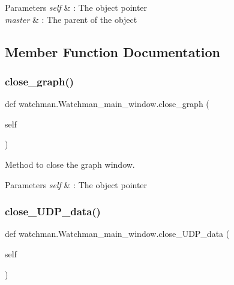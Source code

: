 \begin{DoxyParams}{Parameters}
{\em self} & \+: The object pointer \\
\hline
{\em master} & \+: The parent of the object \\
\hline
\end{DoxyParams}


\subsection{Member Function Documentation}
\mbox{\label{classwatchman_1_1_watchman__main__window_a7e01631a60bb1132b837329deb96ca73}} 
\subsubsection{\texorpdfstring{close\_graph()}{close\_graph()}}
{\footnotesize\ttfamily def watchman.\+Watchman\+\_\+main\+\_\+window.\+close\+\_\+graph (\begin{DoxyParamCaption}\item[{}]{self }\end{DoxyParamCaption})}



Method to close the graph window. 


\begin{DoxyParams}{Parameters}
{\em self} & \+: The object pointer \\
\hline
\end{DoxyParams}
\mbox{\label{classwatchman_1_1_watchman__main__window_a82bd875a2c1e218633bb245011730233}} 
\subsubsection{\texorpdfstring{close\_UDP\_data()}{close\_UDP\_data()}}
{\footnotesize\ttfamily def watchman.\+Watchman\+\_\+main\+\_\+window.\+close\+\_\+\+U\+D\+P\+\_\+data (\begin{DoxyParamCaption}\item[{}]{self }\end{DoxyParamCaption})}



